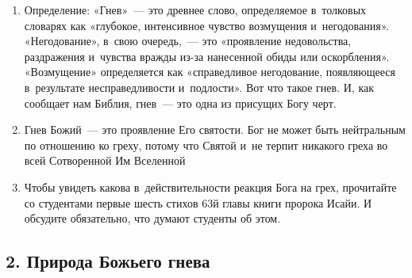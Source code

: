 \documentclass[a4paper,12pt]{article}
\begin{document}
\begin{enumerate}
    \item Определение: «Гнев»~--- это древнее слово, определяемое в~толковых словарях как «глубокое, интенсивное чувство возмущения и~негодования». «Негодование», в~свою очередь,~--- это «проявление недовольства, раздражения и~чувства вражды из-за нанесенной обиды или оскорбления». «Возмущение» определяется как «справедливое негодование, появляющееся в~результате несправедливости и~подлости». Вот что такое гнев. И, как сообщает нам Библия, гнев~--- это одна из присущих Богу черт.
    \item Гнев Божий~--- это проявление Его святости. Бог не может быть нейтральным по отношению ко греху, потому что Святой и~не терпит никакого греха во всей Сотворенной Им Вселенной
    \item Чтобы увидеть какова в~действительности реакция Бога на грех, прочитайте со студентами первые шесть стихов 63й главы книги пророка Исайи. И обсудите обязательно, что думают студенты об этом.
\end{enumerate}
        
\subsection{2. Природа Божьего гнева}        
            
\end{document}
